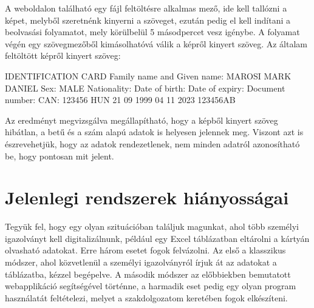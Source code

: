 \documentclass[12pt]{report}
\begin{document}
A weboldalon található egy fájl feltöltésre alkalmas mező, ide kell tallózni a képet, melyből szeretnénk kinyerni a szöveget, ezután pedig el kell indítani a beolvasási folyamatot, mely körülbelül 5 másodpercet vesz igénybe. A folyamat végén egy szövegmezőből kimásolhatóvá válik a képről kinyert szöveg. Az általam feltöltött képről kinyert szöveg:
\newline
\begin{tcolorbox}
    IDENTIFICATION CARD Family name and Given name: MAROSI MARK DANIEL Sex: MALE Nationality: Date of birth: Date of expiry: Document number: CAN: 123456 HUN 21 09 1999 04 11 2023 123456AB
\end{tcolorbox}
\newline
Az eredményt megvizsgálva megállapítható, hogy a képből kinyert szöveg hibátlan, a betű és a szám alapú adatok is helyesen jelennek meg. Viszont azt is észrevehetjük, hogy az adatok rendezetlenek, nem minden adatról azonosítható be, hogy pontosan mit jelent.

\section{Jelenlegi rendszerek hiányosságai}

Tegyük fel, hogy egy olyan szituációban találjuk magunkat, ahol több személyi igazolványt kell digitalizálnunk, például egy Excel táblázatban eltárolni a kártyán olvasható adatokat. Erre három esetet fogok felvázolni. Az első a klasszikus módszer, ahol közvetlenül a személyi igazolványról írjuk át az adatokat a táblázatba, kézzel begépelve. A második módszer az előbbiekben bemutatott webapplikáció segítségével történne, a harmadik eset pedig egy olyan program használatát feltételezi, melyet a szakdolgozatom keretében fogok elkészíteni.
\end{document}
